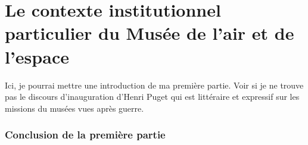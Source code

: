 \documentclass[12pt,twoside]{book}
\begin{document}
	
	
	
	
	\nocite{*}
	
	
	\newpage{\pagestyle{empty}\cleardoublepage}
	
	
	\mainmatter
	
	
	\part{Le contexte institutionnel particulier du Musée de l'air et de l'espace}
	
	
	Ici, je pourrai mettre une introduction de ma première partie.
	Voir si je ne trouve pas le discours d'inauguration d'Henri Puget qui est littéraire et expressif sur les missions du musées vues après guerre.
	
	
	 
	
	
	
	\section*{Conclusion de la première partie}
	
\end{document}
